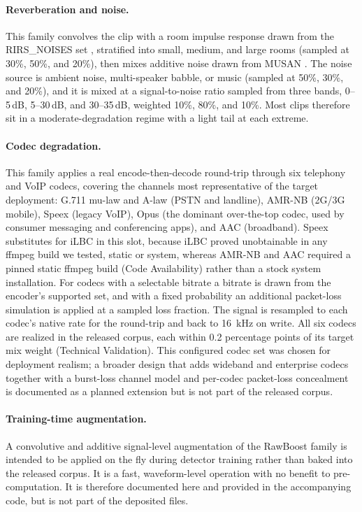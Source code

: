 \documentclass[11pt]{article}
\begin{document}
\paragraph{Reverberation and noise.} This family convolves the clip with
a room impulse response drawn from the RIRS\_NOISES set \citep{ko2017rir},
stratified into small, medium, and large rooms (sampled at 30\%, 50\%,
and 20\%), then mixes additive noise drawn from MUSAN \citep{musan}. The
noise source is ambient noise, multi-speaker babble, or music (sampled
at 50\%, 30\%, and 20\%), and it is mixed at a signal-to-noise ratio
sampled from three bands, 0--5\,dB, 5--30\,dB, and 30--35\,dB, weighted
10\%, 80\%, and 10\%. Most clips therefore sit in a moderate-degradation
regime with a light tail at each extreme.

\paragraph{Codec degradation.} This family applies a real
encode-then-decode round-trip through six telephony and VoIP codecs,
covering the channels most representative of the target deployment:
G.711 mu-law and A-law (PSTN and landline), AMR-NB (2G/3G mobile), Speex
(legacy VoIP), Opus (the dominant over-the-top codec, used by consumer
messaging and conferencing apps), and AAC (broadband). Speex substitutes
for iLBC in this slot, because iLBC proved unobtainable in any ffmpeg
build we tested, static or system, whereas AMR-NB and AAC required a pinned
static ffmpeg build (Code Availability) rather than a stock system
installation. For codecs with a selectable bitrate a bitrate is drawn
from the encoder's supported set, and with a fixed probability an
additional packet-loss simulation is applied at a sampled loss fraction.
The signal is resampled to each codec's native rate for the round-trip
and back to \SI{16}{\kilo\hertz} on write. All six codecs are realized
in the released corpus, each within 0.2 percentage points of its target
mix weight (Technical Validation). This configured codec set was chosen
for deployment realism; a broader design that adds wideband and
enterprise codecs together with a burst-loss channel model and per-codec
packet-loss concealment is documented as a planned extension but is not
part of the released corpus.

\paragraph{Training-time augmentation.} A convolutive and additive
signal-level augmentation of the RawBoost family \citep{tak2022ssl} is
intended to be applied on the fly during detector training rather than
baked into the released corpus. It is a fast, waveform-level operation with no benefit to
pre-computation. It is therefore documented here and provided in the
accompanying code, but is not part of the deposited files.
\end{document}
